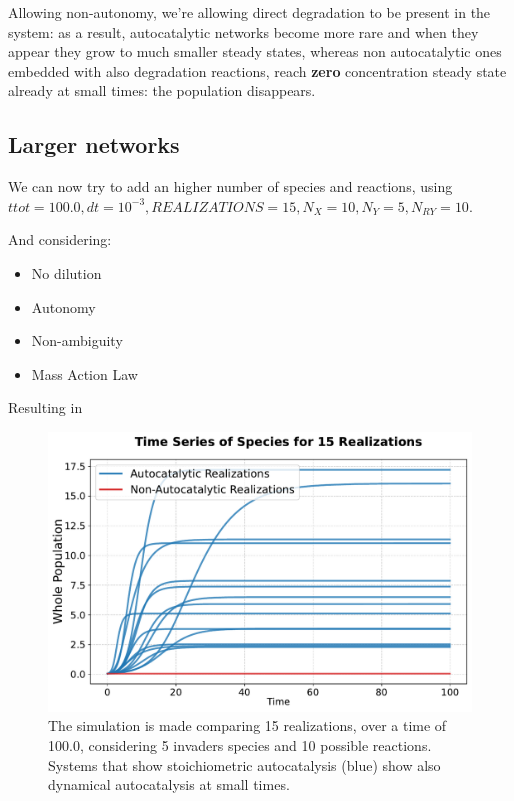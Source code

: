 \documentclass{article}
\begin{document}
Allowing non-autonomy, we're allowing direct degradation to be present in the system: as a result, autocatalytic networks become more rare and when they appear they grow to much smaller steady states, whereas non autocatalytic ones embedded with also degradation reactions, reach \textbf{zero} concentration steady state already at small times: the population disappears.

\subsection{Larger networks}
We can now try to add an higher number of species and reactions, using
$ttot = 100.0, dt = 10^{-3}, REALIZATIONS = 15, N_X = 10, N_Y = 5, N_{RY} = 10.$


\begin{flushleft}
And considering:    
\end{flushleft}
\begin{itemize}
    \item No dilution
    \item Autonomy
    \item Non-ambiguity
    \item Mass Action Law
\end{itemize}

\begin{flushleft}
    Resulting in 
\end{flushleft}

\begin{figure}[H]
    \centering
    \includegraphics[width=0.6\linewidth]{traj_large_elegant.pdf} 
    \caption{\small{The simulation is made comparing 15 realizations, over a time of 100.0, considering 5 invaders species and 10 possible reactions. Systems that show stoichiometric autocatalysis (blue) show also dynamical autocatalysis at small times.}}
    \label{Fig. 6}
\end{figure}
\end{document}
